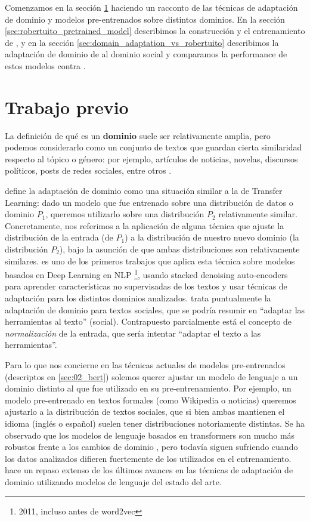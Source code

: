 Comenzamos en la sección \ref{sec:domain_adaptation_previous_work} haciendo un racconto de las técnicas de adaptación de dominio y modelos pre-entrenados sobre distintos dominios. En la sección \ref{sec:robertuito_pretrained_model} describimos la construcción y el entrenamiento de \robertuito{} \cite{perez2021robertuito}, y en la sección \ref{sec:domain_adaptation_vs_robertuito} describimos la adaptación de dominio de \beto{} al dominio social y comparamos la performance de estos modelos contra \robertuito{}.

\section{Trabajo previo}
\label{sec:domain_adaptation_previous_work}

La definición de qué es un \textbf{dominio} suele ser relativamente amplia, pero podemos considerarlo como un conjunto de textos que guardan cierta similaridad respecto al tópico o género: por ejemplo, artículos de noticias, novelas, discursos políticos, posts de redes sociales, entre otros \cite{gururangan-etal-2020-dont}.

\citet{goodfellow2016deep} define la adaptación de dominio como una situación similar a la de Transfer Learning: dado un modelo que fue entrenado sobre una distribución de datos o dominio $P_1$, queremos utilizarlo sobre una distribución $P_2$ relativamente similar. Concretamente, nos referimos a la aplicación de alguna técnica que ajuste la distribución de la entrada (de $P_1$) a la distribución de nuestro nuevo dominio (la distribución $P_2$), bajo la asunción de que ambas distribuciones son relativamente similares. \citet{glorot2011domain} es uno de los primeros trabajos que aplica esta técnica sobre modelos basados en Deep Learning en NLP \footnote{2011, incluso antes de word2vec}, usando stacked denoising auto-encoders para aprender características no supervisadas de los textos y usar técnicas de adaptación para los distintos dominios analizados. \citet{eisenstein2013bad} trata puntualmente la adaptación de dominio para textos sociales, que se podría resumir en ``adaptar las herramientas al texto'' (social). Contrapuesto parcialmente está el concepto de \emph{normalización} de la entrada, que sería intentar ``adaptar el texto a las herramientas''.

Para lo que nos concierne en las técnicas actuales de modelos pre-entrenados (descriptos en \ref{sec:02_bert}) solemos querer ajustar un modelo de lenguaje a un dominio distinto al que fue utilizado en su pre-entrenamiento. Por ejemplo, un modelo \bert{} pre-entrenado en textos formales (como Wikipedia o noticias) queremos ajustarlo a la distribución de textos sociales, que si bien ambas mantienen el idioma (inglés o español) suelen tener distribuciones notoriamente distintas. Se ha observado que los modelos de lenguaje basados en transformers son mucho más robustos frente a los cambios de dominio \cite{hendrycks-etal-2020-pretrained}, pero todavía siguen sufriendo cuando los datos analizados difieren fuertemente de los utilizados en el entrenamiento. \citet{ruder2021lmfine-tuning} hace un repaso extenso de los últimos avances en las técnicas de adaptación de dominio utilizando modelos de lenguaje del estado del arte.

